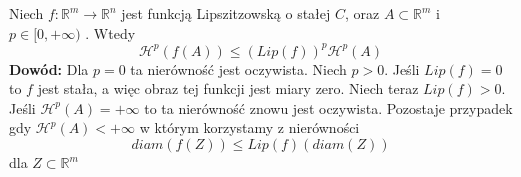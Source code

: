 \begin{lem}
	Niech $f: \mathbb{R}^m \rightarrow \mathbb{R}^n$ jest funkcją Lipszitzowską o stałej $C$, oraz $A \subset \mathbb{R}^m$ i $p \in [0, + \infty)$ . Wtedy $$
		\mathcal{H}^p(f(A)) \leq (Lip(f))^p \mathcal{H}^p(A)
	$$
	\textbf{Dowód:}\newline
	Dla $p=0$ ta nierówność jest oczywista. Niech $p>0$. Jeśli $Lip(f) = 0$ to $f$ jest stała, a więc obraz tej funkcji jest miary zero. Niech teraz $Lip(f)>0$. Jeśli $\mathcal{H}^p(A) = +\infty$ to ta nierówność znowu jest oczywista. Pozostaje przypadek gdy $\mathcal{H}^p(A) < +\infty$ w którym korzystamy z nierówności $$
		diam(f(Z)) \leq Lip(f)(diam(Z))
	$$
	dla $Z \subset \mathbb{R}^m$ 
\end{lem}